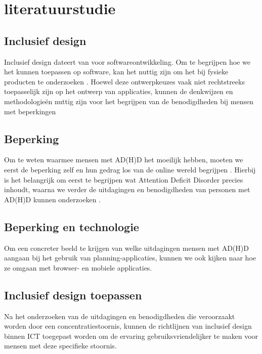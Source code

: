 
\section{literatuurstudie}%
\label{sec:literatuurstudie}

\subsection{Inclusief design} %
Inclusief design dateert van voor softwareontwikkeling. Om te begrijpen hoe we het kunnen toepassen op software, kan het nuttig zijn om het bij fysieke producten te onderzoeken \autocite{Clarkson2003}. Hoewel deze ontwerpkeuzes vaak niet rechtstreeks toepasselijk zijn op het ontwerp van applicaties, kunnen de denkwijzen en methodologieën nuttig zijn voor het begrijpen van de benodigdheden bij mensen met beperkingen \newline

\subsection{Beperking} %
Om te weten waarmee mensen met AD(H)D het moeilijk hebben, moeten we eerst de beperking zelf en hun gedrag los van de online wereld  begrijpen \autocite{VanHerwegen2019} . Hierbij is het belangrijk om eerst te begrijpen wat Attention Deficit Disorder precies inhoudt, waarna we verder de uitdagingen en benodigdheden van personen met AD(H)D kunnen onderzoeken \autocite{diamond2005attention}.
\newline

\subsection{Beperking en technologie} %
Om een concreter beeld te krijgen van welke uitdagingen mensen met AD(H)D aangaan bij het gebruik van planning-applicaties, kunnen we ook kijken naar hoe ze omgaan met browser- \autocite{Harrysson2004} en mobiele \autocite{Rapp2019} applicaties. \newline

\subsection{Inclusief design toepassen} %
Na het onderzoeken van de uitdagingen en benodigdheden die veroorzaakt worden door een concentratiestoornis, kunnen de richtlijnen van inclusief design binnen ICT \autocite{Gulliksen2004, Nicolle2001, Roessvoll2013} toegepast worden om de ervaring gebruiksvriendelijker te maken voor mensen met deze specifieke stoornis.


